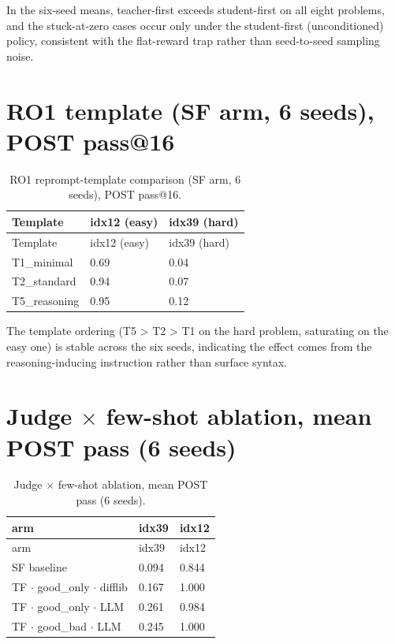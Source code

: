 In the six-seed means, teacher-first exceeds student-first on all eight problems, and the stuck-at-zero cases occur only under the student-first (unconditioned) policy, consistent with the flat-reward trap rather than seed-to-seed sampling noise.

\section{RO1 template (SF arm, 6 seeds), POST pass@16}\label{e.4-rq1-template-sf-arm-6-seeds-post-pass16}

\begin{longtable}{lll}
\caption{RO1 reprompt-template comparison (SF arm, 6 seeds), POST pass@16.}\\
\toprule
Template & idx12 (easy) & idx39 (hard) \\
\midrule
\endfirsthead
\toprule
Template & idx12 (easy) & idx39 (hard) \\
\midrule
\endhead
\bottomrule
\endfoot
T1\_minimal & 0.69 & 0.04 \\
T2\_standard & 0.94 & 0.07 \\
T5\_reasoning & 0.95 & 0.12 \\
\end{longtable}

The template ordering (T5 \textgreater{} T2 \textgreater{} T1 on the hard problem, saturating on the easy one) is stable across the six seeds, indicating the effect comes from the reasoning-inducing instruction rather than surface syntax.

\section{Judge $\times$ few-shot ablation, mean POST pass (6 seeds)}\label{e.5-judge-few-shot-ablation-mean-post-pass-6-seeds}

\begin{longtable}{lll}
\caption{Judge $\times$ few-shot ablation, mean POST pass (6 seeds).}\\
\toprule
arm & idx39 & idx12 \\
\midrule
\endfirsthead
\toprule
arm & idx39 & idx12 \\
\midrule
\endhead
\bottomrule
\endfoot
SF baseline & 0.094 & 0.844 \\
TF $\cdot$ good\_only $\cdot$ difflib & 0.167 & 1.000 \\
TF $\cdot$ good\_only $\cdot$ LLM & 0.261 & 0.984 \\
TF $\cdot$ good\_bad $\cdot$ LLM & 0.245 & 1.000 \\
\end{longtable}

